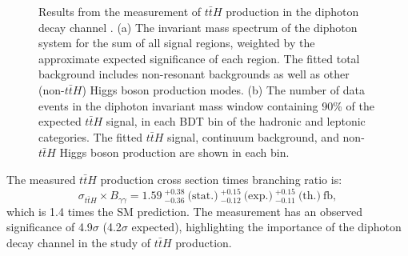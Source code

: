 \documentclass{moriond}
\def\tth{\ensuremath{t\bar{t}H}\xspace}
\begin{document}
\begin{figure}[!htbp]
  \centering
  \caption{
    Results from the measurement of \tth production in the diphoton decay channel \cite{ATLAS-CONF-2019-004}.
    (a) The invariant mass spectrum of the diphoton system for the sum of all signal regions, weighted
    by the approximate expected significance of each region. The fitted total background includes non-resonant
    backgrounds as well as other (non-\tth) Higgs boson production modes.
    (b) The number of data events in the diphoton invariant mass window containing 90\% of the expected
    \tth signal, in each BDT bin of the hadronic and leptonic categories.
    The fitted \tth signal, continuum background, and non-\tth Higgs boson production are shown in each bin.
  }
  \label{fig:tth}
\end{figure}

The measured \tth production cross section times branching ratio
is:
%
\begin{equation}
\sigma_{\tth} \times B_{\gamma\gamma} = 1.59~^{+0.38}_{-0.36} ~\textrm{(stat.)}
~^{+0.15}_{-0.12} ~\textrm{(exp.)}
~^{+0.15}_{-0.11} ~\textrm{(th.)}~\textrm{fb},
\end{equation}
%
which is 1.4 times the SM prediction.
The measurement has an observed significance of 4.9$\sigma$ (4.2$\sigma$ expected),
highlighting the importance of the diphoton decay channel in the study of \tth production.
\end{document}
